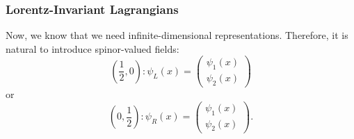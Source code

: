 \documentclass[11pt]{article}
\theoremstyle{definition}
\begin{document}
\subsubsection{Lorentz-Invariant Lagrangians}
Now, we know that we need infinite-dimensional representations. Therefore, it is natural to introduce spinor-valued fields:
\begin{equation}
     \left(\frac{1}{2}, 0\right): \psi_L(x) = \begin{pmatrix}
         \psi_1(x)\\
         \psi_2(x)
     \end{pmatrix}
\end{equation}
or
\begin{equation}
     \left(0, \frac{1}{2}\right): \psi_R(x) = \begin{pmatrix}
         \psi_1(x)\\
         \psi_2(x)
     \end{pmatrix}.
\end{equation}
\end{document}
